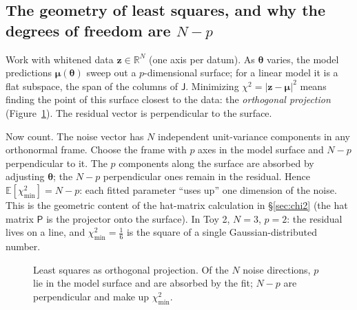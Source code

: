 \documentclass[11pt,a4paper]{article}
\numberwithin{equation}{section}
\theoremstyle{definition}
\theoremstyle{plain}
\theoremstyle{remark}
\numberwithin{algorithm}{section}
\newcommand{\sJ}{\mathsf J}
\newcommand{\sP}{\mathsf P}
\newcommand{\vth}{\bm\theta}
\begin{document}
\subsection{The geometry of least squares, and why the degrees of freedom are \texorpdfstring{$N-p$}{N-p}}\label{sec:pr-geometry}
Work with whitened data $\bm z\in\mathbb R^N$ (one axis per datum). As $\vth$ varies, the model predictions $\bm\mu(\vth)$ sweep out a $p$-dimensional surface; for a linear model it is a flat subspace, the span of the columns of $\sJ$. Minimizing $\chi^2=|\bm z-\bm\mu|^2$ means finding the point of this surface closest to the data: the \emph{orthogonal projection} (Figure~\ref{fig:pr-geom}). The residual vector is perpendicular to the surface.

Now count. The noise vector has $N$ independent unit-variance components in any orthonormal frame. Choose the frame with $p$ axes in the model surface and $N-p$ perpendicular to it. The $p$ components along the surface are absorbed by adjusting $\vth$; the $N-p$ perpendicular ones remain in the residual. Hence $\mathbb E[\chi^2_{\min}]=N-p$: each fitted parameter ``uses up'' one dimension of the noise. This is the geometric content of the hat-matrix calculation in \S\ref{sec:chi2} (the hat matrix $\sP$ is the projector onto the surface). In Toy 2, $N=3$, $p=2$: the residual lives on a line, and $\chi^2_{\min}=\frac16$ is the square of a single Gaussian-distributed number.

\begin{figure}[h]\centering
{}
\caption{Least squares as orthogonal projection. Of the $N$ noise directions, $p$ lie in the model surface and are absorbed by the fit; $N-p$ are perpendicular and make up $\chi^2_{\min}$.}\label{fig:pr-geom}
\end{figure}
\end{document}
